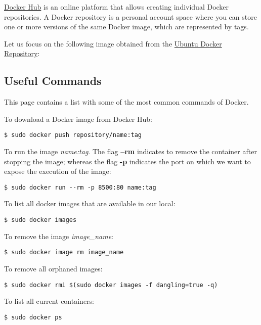\documentclass[]{book}
\begin{document}
\href{https://hub.docker.com/}{Docker Hub} is an online platform that
allows creating individual Docker repositories. A Docker repository is a
personal account space where you can store one or more versions of the
same Docker image, which are represented by tags.

Let us focus on the following image obtained from the
\href{https://hub.docker.com/_/ubuntu?tab=tags}{Ubuntu Docker
Repository}:

\subsection{Useful Commands}\label{useful-commands}

This page contains a list with some of the most common commands of
Docker.

To download a Docker image from Docker Hub:

\begin{verbatim}
$ sudo docker push repository/name:tag
\end{verbatim}

To run the image \emph{name:tag}. The flag \textbf{--rm} indicates to
remove the container after stopping the image; whereas the flag
\textbf{-p} indicates the port on which we want to expose the execution
of the image:

\begin{verbatim}
$ sudo docker run --rm -p 8500:80 name:tag
\end{verbatim}

To list all docker images that are available in our local:

\begin{verbatim}
$ sudo docker images
\end{verbatim}

To remove the image \emph{image\_name}:

\begin{verbatim}
$ sudo docker image rm image_name
\end{verbatim}

To remove all orphaned images:

\begin{verbatim}
$ sudo docker rmi $(sudo docker images -f dangling=true -q)
\end{verbatim}

To list all current containers:

\begin{verbatim}
$ sudo docker ps
\end{verbatim}
\end{document}
